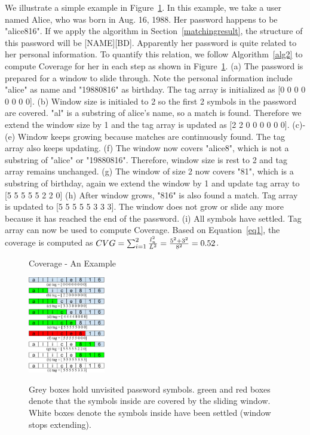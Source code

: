 \documentclass{sig-alternate}
\begin{document}
We illustrate a simple example in Figure~\ref{f1}. In this example, we take a user named Alice, who was born in Aug. 16, 1988. Her password happens to be "alice816". If we apply the algorithm in Section~\ref{matchingresult}, the structure of this password will be [NAME][BD]. Apparently her password is quite related to her personal information. To quantify this relation, we follow Algorithm~\ref{alg2} to compute Coverage for her in each step as shown in Figure~\ref{f1}. (a) The password is prepared for a window to slide through. Note the personal information include "alice" as name and "19880816" as birthday. The tag array is initialized as [0 0 0 0 0 0 0 0]. (b) Window size is initialed to 2 so the first 2 symbols in the password are covered. "al" is a substring of alice's name, so a match is found. Therefore we extend the window size by 1 and the tag array is updated as [2 2 0 0 0 0 0 0]. (c)-(e) Window keeps growing because matches are continuously found. The tag array also keeps updating. (f) The window now covers "alice8", which is not a substring of "alice" or "19880816". Therefore, window size is rest to 2 and tag array remains unchanged. (g) The window of size 2 now covers "81", which is a substring of birthday, again we extend the window by 1 and update tag array to [5 5 5 5 5 2 2 0] (h) After window grows, "816" is also found a match. Tag array is updated to [5 5 5 5 5 3 3 3]. The window does not grow or slide any more because it has reached the end of the password. (i) All symbols have settled. Tag array can now be used to compute Coverage. Based on Equation~\ref{eq1}, the coverage is computed as $CVG  = \sum_{i=1}^2 {{l_n^2} \over {L^2}} = {{5^2 + 3^2}\over{8^2}}= 0.52$.

\begin{figure}[h!]
\centering
  \caption{Coverage - An Example}{}
  \label{f1}
  \centering
    \includegraphics[width=0.3\textwidth]{fig/cvgfig}
\caption*{Grey boxes hold unvisited password symbols. green and red boxes denote that the symbols inside are covered by the sliding window. White boxes denote the symbols inside have been settled (window stops extending). }

\end{figure}
\end{document}
